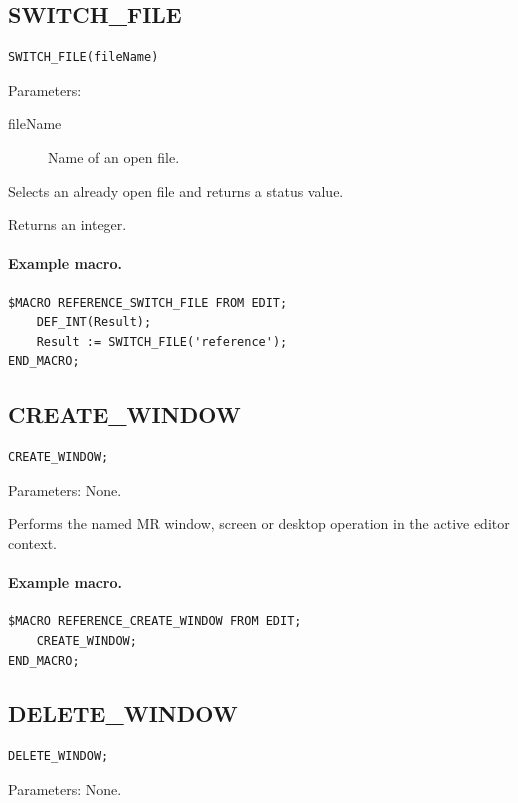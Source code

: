 \documentclass[a4paper,10pt,twoside,openany]{book}
\begin{document}
\label{prim:intrinsic-switch-file}
\subsection*{SWITCH\_FILE}
\begin{verbatim}
SWITCH_FILE(fileName)
\end{verbatim}
Parameters:
\begin{description}
\item[fileName] Name of an open file.
\end{description}

Selects an already open file and returns a status value.

Returns an integer.

\paragraph{Example macro.}
\begin{verbatim}
$MACRO REFERENCE_SWITCH_FILE FROM EDIT;
    DEF_INT(Result);
    Result := SWITCH_FILE('reference');
END_MACRO;
\end{verbatim}

\label{prim:procedure-create-window}
\subsection*{CREATE\_WINDOW}
\begin{verbatim}
CREATE_WINDOW;
\end{verbatim}
Parameters: None.

Performs the named MR window, screen or desktop operation in the active editor context.

\paragraph{Example macro.}
\begin{verbatim}
$MACRO REFERENCE_CREATE_WINDOW FROM EDIT;
    CREATE_WINDOW;
END_MACRO;
\end{verbatim}

\label{prim:procedure-delete-window}
\subsection*{DELETE\_WINDOW}
\begin{verbatim}
DELETE_WINDOW;
\end{verbatim}
Parameters: None.
\end{document}
